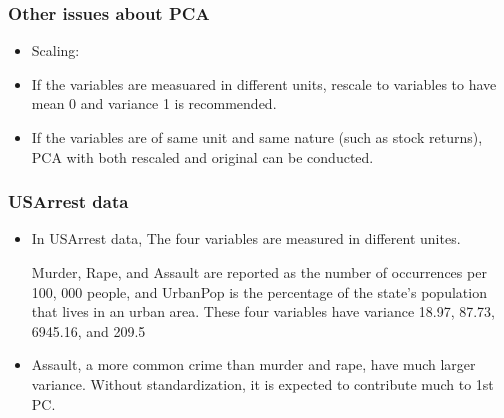 \documentclass{beamer}
\begin{document}
             
             \begin{frame}
             	\frametitle{Other issues about PCA }
             	\begin{itemize}
             		\item Scaling: 
             		\item If the variables are measuared in different units, rescale to variables to have mean 0 and variance 1 is recommended.
             		\item If the variables are of same unit and same nature (such as stock returns), PCA with both
             		rescaled and original can be conducted. 
             		\bigskip
             		  	\end{itemize}
             		  \end{frame}
             		  
             		  
             		  
             		  
             		  \begin{frame}
             		  	\frametitle{USArrest data }
             		  	\begin{itemize}
             		
             		\item In USArrest data, The four variables are measured in different unites.
       
                 Murder, Rape, and Assault are
             		reported as the number of occurrences per 100, 000 people, and UrbanPop
             		is the percentage of the state’s population that lives in an urban area.
             		These four variables have variance 18.97, 87.73, 6945.16, and 209.5
             		
             		\item Assault, a more common crime than murder and rape, have much larger variance.
             		Without standardization, it is expected to contribute much to 1st PC. 
             		
             	\end{itemize}
             \end{frame} 
         
         
         
\end{document}
